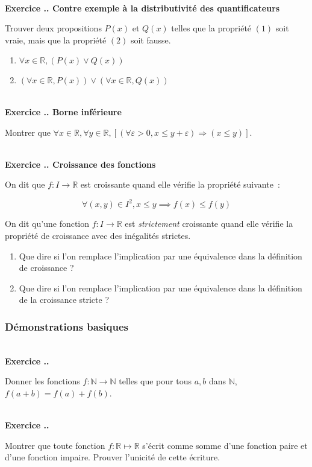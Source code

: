 \documentclass{article}
\newcommand{\mb}[1]{\mathbb{#1}}
\newcounter{exo}
\newcommand{\exercice}[1][\null]{\textbf{\\ Exercice \thesection.\theexo. #1} \addtocounter{exo}{1}}
\begin{document}
\exercice[Contre exemple à la distributivité des quantificateurs]

Trouver deux propositions $P(x)$ et $Q(x)$ telles que la propriété 
$(1)$ soit vraie, mais que la propriété $(2)$ soit fausse.

\begin{enumerate}[(1)]
    \item $\forall x \in \mathbb{R}, (P (x) \vee Q(x))$
    \item $\left(\forall x \in \mathbb{R}, P(x)\right) 
        \vee 
        \left(\forall x \in \mathbb{R}, Q(x)\right)$
\end{enumerate}

\exercice[Borne inférieure]

Montrer que $\forall x \in \mb{R}, \forall y \in \mb{R}, \left[ (\forall \varepsilon > 0, x \le y + \varepsilon) \Rightarrow (x \le y) \right]$.

\exercice[Croissance des fonctions]

On dit que $f : I \to \mb{R}$ est croissante 
quand elle vérifie la propriété suivante~:

\begin{equation}
    \forall (x,y) \in I^2, x \leq y \implies f(x) \leq f(y)
\end{equation}

On dit qu'une fonction $f : I \to \mb{R}$ est \emph{strictement}
croissante quand elle vérifie la propriété de croissance avec 
des inégalités strictes.

\begin{enumerate}
    \item Que dire si l'on remplace l'implication par une équivalence 
        dans la définition de croissance ?
    \item Que dire si l'on remplace l'implication par une équivalence 
        dans la définition de la croissance stricte ?
\end{enumerate}


\subsubsection{Démonstrations basiques}

\exercice Donner les fonctions $f : \mb{N} \rightarrow \mb{N}$ telles que pour tous $a,b$ dans $\mb{N}$, $f(a+b) = f(a)+f(b)$.



\exercice  Montrer que toute fonction $f : \mb{R} \mapsto \mb{R}$ s'écrit comme somme d'une fonction paire et d'une fonction impaire. Prouver l'unicité de cette écriture.
\end{document}
